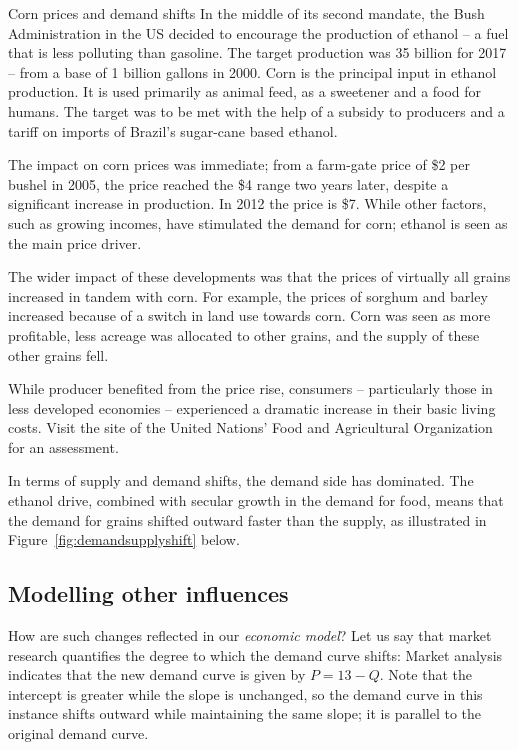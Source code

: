 

\begin{ApplicationBox}{Corn prices and demand shifts \label{app:cornprice}}
In the middle of its second mandate, the Bush Administration in the US decided to encourage the production of ethanol -- a fuel that is less polluting than gasoline. The target production was 35 billion for 2017 -- from a base of 1 billion gallons in 2000. Corn is the principal input in ethanol production. It is used primarily as animal feed, as a sweetener and a food for humans. The target was to be met with the help of a subsidy to producers and a tariff on imports of Brazil's sugar-cane based ethanol.

\bigskip
The impact on corn prices was immediate; from a farm-gate price of \$2 per bushel in 2005, the price reached the \$4 range two years later, despite a significant increase in production. In 2012 the price is \$7. While other factors, such as growing incomes, have stimulated the demand for corn; ethanol is seen as the main price driver.

\bigskip
The wider impact of these developments was that the prices of virtually all grains increased in tandem with corn. For example, the prices of sorghum and barley increased because of a switch in land use towards corn. Corn was seen as more profitable, less acreage was allocated to other grains, and the supply of these other grains fell.

\bigskip
While producer benefited from the price rise, consumers -- particularly those in less developed economies -- experienced a dramatic increase in their basic living costs. Visit the site of the United Nations' Food and Agricultural Organization for an assessment.

\bigskip
In terms of supply and demand shifts, the demand side has dominated. The ethanol drive, combined with secular growth in the demand for food, means that the demand for grains shifted outward faster than the supply, as illustrated in Figure~\ref{fig:demandsupplyshift} below.
\end{ApplicationBox}

\subsection*{Modelling other influences}

How are such changes reflected in our \textit{economic model}? Let us say that market research quantifies the degree to which the demand curve shifts: Market analysis indicates that the new demand curve is given by $P=13-Q$. Note that the intercept is greater while the slope is unchanged, so the demand curve in this instance shifts outward while maintaining the same slope; it is parallel to the original demand curve. 

